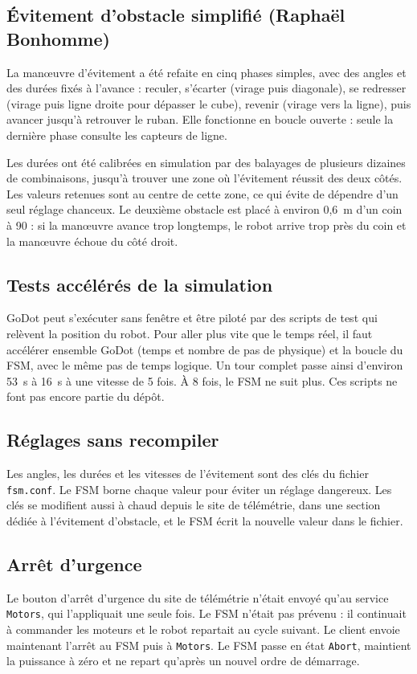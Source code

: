 \subsection{Évitement d'obstacle simplifié (Raphaël Bonhomme)}
La manœuvre d'évitement a été refaite en cinq phases simples, avec des angles et des durées fixés à l'avance : reculer, s'écarter (virage puis diagonale), se redresser (virage puis ligne droite pour dépasser le cube), revenir (virage vers la ligne), puis avancer jusqu'à retrouver le ruban.
Elle fonctionne en boucle ouverte : seule la dernière phase consulte les capteurs de ligne.

Les durées ont été calibrées en simulation par des balayages de plusieurs dizaines de combinaisons, jusqu'à trouver une zone où l'évitement réussit des deux côtés.
Les valeurs retenues sont au centre de cette zone, ce qui évite de dépendre d'un seul réglage chanceux.
Le deuxième obstacle est placé à environ 0,6~m d'un coin à 90\degree{} : si la manœuvre avance trop longtemps, le robot arrive trop près du coin et la manœuvre échoue du côté droit.

\subsection{Tests accélérés de la simulation}
GoDot peut s'exécuter sans fenêtre et être piloté par des scripts de test qui relèvent la position du robot.
Pour aller plus vite que le temps réel, il faut accélérer ensemble GoDot (temps et nombre de pas de physique) et la boucle du FSM, avec le même pas de temps logique.
Un tour complet passe ainsi d'environ 53~s à 16~s à une vitesse de 5 fois.
À 8 fois, le FSM ne suit plus.
Ces scripts ne font pas encore partie du dépôt.

\subsection{Réglages sans recompiler}
Les angles, les durées et les vitesses de l'évitement sont des clés du fichier \texttt{fsm.conf}.
Le FSM borne chaque valeur pour éviter un réglage dangereux.
Les clés se modifient aussi à chaud depuis le site de télémétrie, dans une section dédiée à l'évitement d'obstacle, et le FSM écrit la nouvelle valeur dans le fichier.

\subsection{Arrêt d'urgence}
Le bouton d'arrêt d'urgence du site de télémétrie n'était envoyé qu'au service \texttt{Motors}, qui l'appliquait une seule fois.
Le FSM n'était pas prévenu : il continuait à commander les moteurs et le robot repartait au cycle suivant.
Le client envoie maintenant l'arrêt au FSM puis à \texttt{Motors}.
Le FSM passe en état \texttt{Abort}, maintient la puissance à zéro et ne repart qu'après un nouvel ordre de démarrage.

